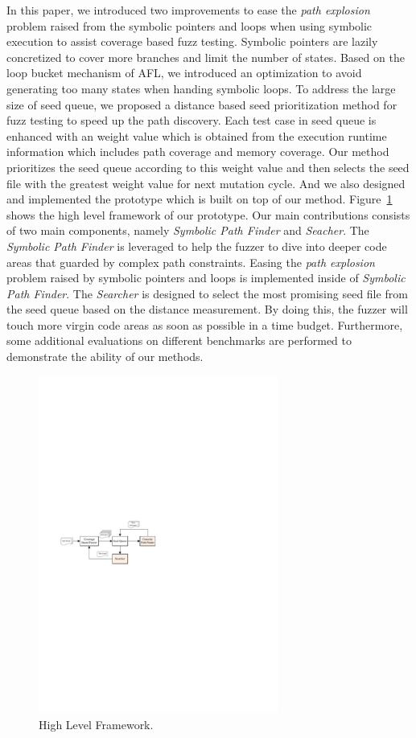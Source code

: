 In this paper, we introduced two improvements to ease the \textit{path explosion} problem raised from the symbolic pointers and loops when using symbolic execution to assist coverage based fuzz testing. 
Symbolic pointers are lazily concretized to cover more branches and limit the number of states. 
Based on the loop bucket mechanism of AFL, we introduced an optimization to avoid generating too many states when handing symbolic loops. 
To address the large size of seed queue, we proposed a distance based seed prioritization method for fuzz testing to speed up the path discovery. 
Each test case in seed queue is enhanced with an weight value which is obtained from the execution runtime information which includes path coverage and memory coverage.
Our method prioritizes the seed queue according to this weight value and then selects the seed file with the greatest weight value for next mutation cycle.
And we also designed and implemented the prototype which is built on top of our method. Figure~\ref{Framework} shows the high level framework of our prototype.
Our main contributions consists of two main components, namely \emph{Symbolic Path Finder} and \emph{Seacher}. The \emph{Symbolic Path Finder} is leveraged to help the fuzzer to dive into deeper code areas that guarded by complex path constraints. Easing the \textit{path explosion} problem raised by symbolic pointers and loops is implemented inside of \emph{Symbolic Path Finder}. The \emph{Searcher} is designed to select the most promising seed file from the seed queue based on the distance measurement. By doing this, the fuzzer will touch more virgin code areas as soon as possible in a time budget. 
Furthermore, some additional evaluations on different benchmarks are performed to demonstrate the ability of our methods.
\begin{figure}
\centering
\includegraphics[width=0.7\textwidth]{figures/framework.pdf} 
\caption{High Level Framework.}\label{Framework}
\end{figure}

